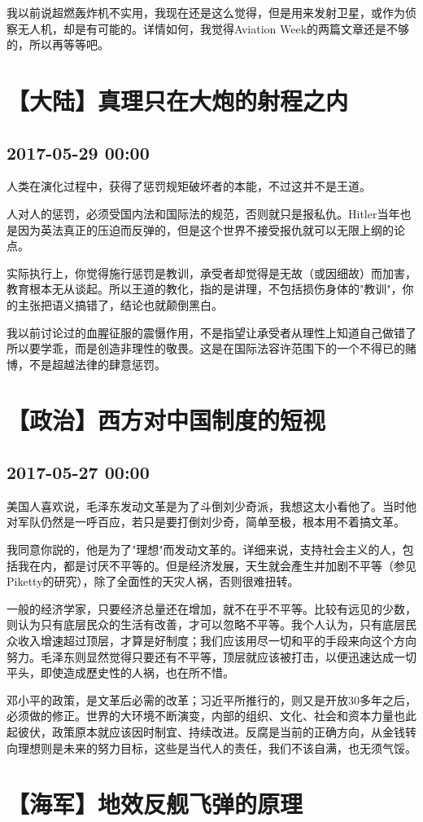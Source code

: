\documentclass[twocolumn]{ctexart}
\begin{document}
我以前说超燃轰炸机不实用，我现在还是这么觉得，但是用来发射卫星，或作为侦察无人机，却是有可能的。详情如何，我觉得Aviation Week的两篇文章还是不够的，所以再等等吧。\section*{【大陆】真理只在大炮的射程之内}
\subsection*{2017-05-29 00:00}
人类在演化过程中，获得了惩罚规矩破坏者的本能，不过这并不是王道。

人对人的惩罚，必须受国内法和国际法的规范，否则就只是报私仇。Hitler当年也是因为英法真正的压迫而反弹的，但是这个世界不接受报仇就可以无限上纲的论点。

实际执行上，你觉得施行惩罚是教训，承受者却觉得是无故（或因细故）而加害，教育根本无从谈起。所以王道的教化，指的是讲理，不包括损伤身体的"教训"，你的主张把语义搞错了，结论也就颠倒黑白。

我以前讨论过的血腥征服的震慑作用，不是指望让承受者从理性上知道自己做错了所以要学乖，而是创造非理性的敬畏。这是在国际法容许范围下的一个不得已的赌博，不是超越法律的肆意惩罚。
\section*{【政治】西方对中国制度的短视}
\subsection*{2017-05-27 00:00}
美国人喜欢说，毛泽东发动文革是为了斗倒刘少奇派，我想这太小看他了。当时他对军队仍然是一呼百应，若只是要打倒刘少奇，简单至极，根本用不着搞文革。

我同意你説的，他是为了"理想"而发动文革的。详细来说，支持社会主义的人，包括我在内，都是讨厌不平等的。但是经济发展，天生就会產生并加剧不平等（参见Piketty的研究），除了全面性的天灾人祸，否则很难扭转。

一般的经济学家，只要经济总量还在增加，就不在乎不平等。比较有远见的少数，则认为只有底层民众的生活有改善，才可以忽略不平等。我个人认为，只有底层民众收入增速超过顶层，才算是好制度；我们应该用尽一切和平的手段来向这个方向努力。毛泽东则显然觉得只要还有不平等，顶层就应该被打击，以便迅速达成一切平头，即使造成歷史性的人祸，也在所不惜。

邓小平的政策，是文革后必需的改革；习近平所推行的，则又是开放30多年之后，必须做的修正。世界的大环境不断演变，内部的组织、文化、社会和资本力量也此起彼伏，政策原本就应该因时制宜、持续改进。反腐是当前的正确方向，从金钱转向理想则是未来的努力目标，这些是当代人的责任，我们不该自满，也无须气馁。\section*{【海军】地效反舰飞弹的原理}
\end{document}
